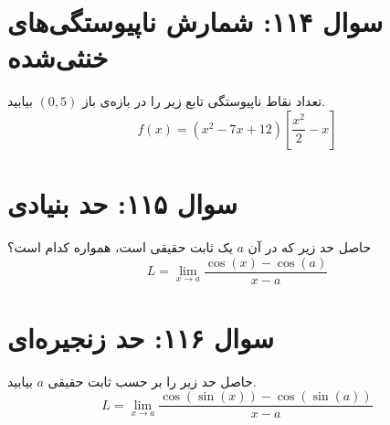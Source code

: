 \documentclass[12pt]{article}
\begin{document}
\vspace{1cm}
\hrulefill
\vspace{1cm}

\section*{سوال ۱۱۴: شمارش ناپیوستگی‌های خنثی‌شده}
تعداد نقاط ناپیوستگی تابع زیر را در بازه‌ی باز \( (0, 5) \) بیابید.
\begin{displaymath}
	f(x) = (x^2 - 7x + 12) \left[ \frac{x^2}{2} - x \right]
\end{displaymath}



\vspace{1cm}
\hrulefill
\vspace{1cm}

\section*{سوال ۱۱۵: حد بنیادی }
حاصل حد زیر که در آن \(a\) یک ثابت حقیقی است، همواره کدام است؟
\begin{displaymath}
	L = \lim_{x \to a} \frac{\cos(x) - \cos(a)}{x - a}
\end{displaymath}



\vspace{1cm}
\hrulefill
\vspace{1cm}

\section*{سوال ۱۱۶: حد زنجیره‌ای}
حاصل حد زیر را بر حسب ثابت حقیقی \(a\) بیابید.
\begin{displaymath}
	L = \lim_{x \to a} \frac{\cos(\sin(x)) - \cos(\sin(a))}{x - a}
\end{displaymath}
\end{document}
